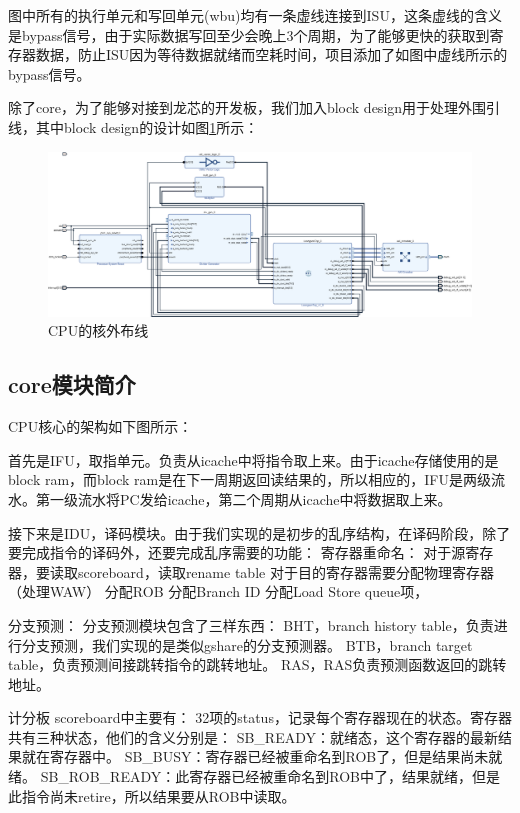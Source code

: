 \documentclass[lang=cn,11pt,a4paper]{elegantpaper}
\begin{document}
图中所有的执行单元和写回单元(wbu)均有一条虚线连接到ISU，这条虚线的含义是bypass信号，由于实际数据写回至少会晚上3个周期，为了能够更快的获取到寄存器数据，防止ISU因为等待数据就绪而空耗时间，项目添加了如图中虚线所示的bypass信号。

除了core，为了能够对接到龙芯的开发板，我们加入block design用于处理外围引线，其中block design的设计如图\ref{fig:design_of_uncore}所示：

\begin{figure}[ht]
	\centering
	\includegraphics[width=\textwidth]{image/uncore.png}
	\caption{CPU的核外布线}\label{fig:design_of_uncore}
\end{figure}

\subsection{core模块简介}

CPU核心的架构如下图所示：

首先是IFU，取指单元。负责从icache中将指令取上来。由于icache存储使用的是block ram，而block ram是在下一周期返回读结果的，所以相应的，IFU是两级流水。第一级流水将PC发给icache，第二个周期从icache中将数据取上来。

接下来是IDU，译码模块。由于我们实现的是初步的乱序结构，在译码阶段，除了要完成指令的译码外，还要完成乱序需要的功能：
寄存器重命名：
对于源寄存器，要读取scoreboard，读取rename table
对于目的寄存器需要分配物理寄存器（处理WAW）
分配ROB
分配Branch ID
分配Load Store queue项，

分支预测：
分支预测模块包含了三样东西：
BHT，branch history table，负责进行分支预测，我们实现的是类似gshare的分支预测器。
BTB，branch target table，负责预测间接跳转指令的跳转地址。
RAS，RAS负责预测函数返回的跳转地址。

计分板
scoreboard中主要有：
32项的status，记录每个寄存器现在的状态。寄存器共有三种状态，他们的含义分别是：
SB\_READY：就绪态，这个寄存器的最新结果就在寄存器中。
SB\_BUSY：寄存器已经被重命名到ROB了，但是结果尚未就绪。
SB\_ROB\_READY：此寄存器已经被重命名到ROB中了，结果就绪，但是此指令尚未retire，所以结果要从ROB中读取。
\end{document}

